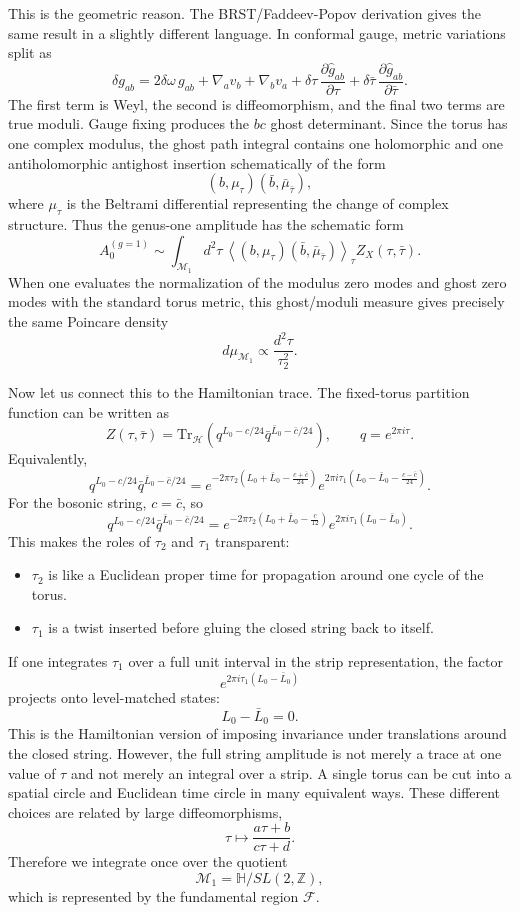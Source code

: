 \documentclass[
  10pt,
  a4paper,
  openany]{book}
\providecommand{\tightlist}{%
  \setlength{\itemsep}{0pt}\setlength{\parskip}{0pt}}
\begin{document}
This is the geometric reason. The BRST/Faddeev-Popov derivation gives
the same result in a slightly different language. In conformal gauge,
metric variations split as \[
\delta g_{ab}
=
2\delta\omega\,g_{ab}
+
\nabla_a v_b+\nabla_b v_a
+
\delta\tau\,\frac{\partial \hat g_{ab}}{\partial \tau}
+
\delta\bar\tau\,\frac{\partial \hat g_{ab}}{\partial \bar\tau}.
\] The first term is Weyl, the second is diffeomorphism, and the final
two terms are true moduli. Gauge fixing produces the \(bc\) ghost
determinant. Since the torus has one complex modulus, the ghost path
integral contains one holomorphic and one antiholomorphic antighost
insertion schematically of the form \[
(b,\mu_\tau)(\bar b,\bar\mu_{\bar\tau}),
\] where \(\mu_\tau\) is the Beltrami differential representing the
change of complex structure. Thus the genus-one amplitude has the
schematic form \[
A_0^{(g=1)}
\sim
\int_{\mathcal M_1} d^2\tau\,
\left\langle
(b,\mu_\tau)(\bar b,\bar\mu_{\bar\tau})
\right\rangle_{\tau}
Z_X(\tau,\bar\tau).
\] When one evaluates the normalization of the modulus zero modes and
ghost zero modes with the standard torus metric, this ghost/moduli
measure gives precisely the same Poincare density \[
d\mu_{\mathcal M_1}
\propto
\frac{d^2\tau}{\tau_2^2}.
\]

Now let us connect this to the Hamiltonian trace. The fixed-torus
partition function can be written as \[
Z(\tau,\bar\tau)
=
\mathrm{Tr}_{\mathcal H}
\left(
q^{L_0-c/24}
\bar q^{\bar L_0-\bar c/24}
\right),
\qquad
q=e^{2\pi i\tau}.
\] Equivalently, \[
q^{L_0-c/24}\bar q^{\bar L_0-\bar c/24}
=
e^{-2\pi\tau_2\left(L_0+\bar L_0-\frac{c+\bar c}{24}\right)}
e^{2\pi i\tau_1\left(L_0-\bar L_0-\frac{c-\bar c}{24}\right)}.
\] For the bosonic string, \(c=\bar c\), so \[
q^{L_0-c/24}\bar q^{\bar L_0-\bar c/24}
=
e^{-2\pi\tau_2\left(L_0+\bar L_0-\frac{c}{12}\right)}
e^{2\pi i\tau_1\left(L_0-\bar L_0\right)}.
\] This makes the roles of \(\tau_2\) and \(\tau_1\) transparent:

\begin{itemize}
\tightlist
\item
  \(\tau_2\) is like a Euclidean proper time for propagation around one
  cycle of the torus.
\item
  \(\tau_1\) is a twist inserted before gluing the closed string back to
  itself.
\end{itemize}

If one integrates \(\tau_1\) over a full unit interval in the strip
representation, the factor \[
e^{2\pi i\tau_1(L_0-\bar L_0)}
\] projects onto level-matched states: \[
L_0-\bar L_0=0.
\] This is the Hamiltonian version of imposing invariance under
translations around the closed string. However, the full string
amplitude is not merely a trace at one value of \(\tau\) and not merely
an integral over a strip. A single torus can be cut into a spatial
circle and Euclidean time circle in many equivalent ways. These
different choices are related by large diffeomorphisms, \[
\tau\mapsto \frac{a\tau+b}{c\tau+d}.
\] Therefore we integrate once over the quotient \[
\mathcal M_1
=
\mathbb H/SL(2,\mathbb Z),
\] which is represented by the fundamental region \(\mathcal F\).
\end{document}
